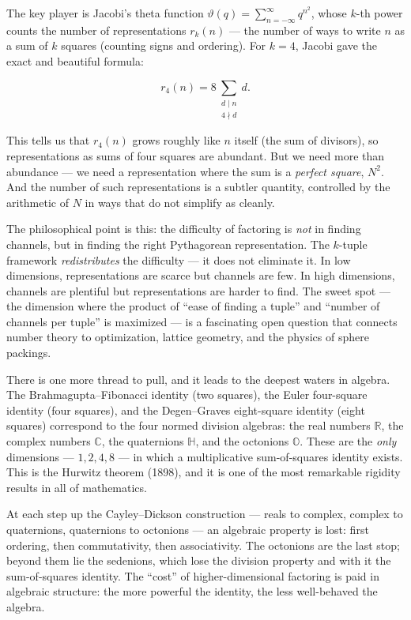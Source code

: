 The key player is Jacobi's theta function \(\vartheta(q) = \sum_{n=-\infty}^{\infty} q^{n^2}\), whose \(k\)-th power counts the number of representations \(r_k(n)\) --- the number of ways to write \(n\) as a sum of \(k\) squares (counting signs and ordering). For \(k = 4\), Jacobi gave the exact and beautiful formula:

\[r_4(n) = 8 \sum_{\substack{d \mid n \\ 4 \nmid d}} d.\]

This tells us that \(r_4(n)\) grows roughly like \(n\) itself (the sum of divisors), so representations as sums of four squares are abundant. But we need more than abundance --- we need a representation where the sum is a \emph{perfect square}, \(N^2\). And the number of such representations is a subtler quantity, controlled by the arithmetic of \(N\) in ways that do not simplify as cleanly.

The philosophical point is this: the difficulty of factoring is \emph{not} in finding channels, but in finding the right Pythagorean representation. The \(k\)-tuple framework \emph{redistributes} the difficulty --- it does not eliminate it. In low dimensions, representations are scarce but channels are few. In high dimensions, channels are plentiful but representations are harder to find. The sweet spot --- the dimension where the product of ``ease of finding a tuple'' and ``number of channels per tuple'' is maximized --- is a fascinating open question that connects number theory to optimization, lattice geometry, and the physics of sphere packings.

There is one more thread to pull, and it leads to the deepest waters in algebra. The Brahmagupta--Fibonacci identity (two squares), the Euler four-square identity (four squares), and the Degen--Graves eight-square identity (eight squares) correspond to the four normed division algebras: the real numbers \(\mathbb{R}\), the complex numbers \(\mathbb{C}\), the quaternions \(\mathbb{H}\), and the octonions \(\mathbb{O}\). These are the \emph{only} dimensions --- \(1, 2, 4, 8\) --- in which a multiplicative sum-of-squares identity exists. This is the Hurwitz theorem (1898), and it is one of the most remarkable rigidity results in all of mathematics.

At each step up the Cayley--Dickson construction --- reals to complex, complex to quaternions, quaternions to octonions --- an algebraic property is lost: first ordering, then commutativity, then associativity. The octonions are the last stop; beyond them lie the sedenions, which lose the division property and with it the sum-of-squares identity. The ``cost'' of higher-dimensional factoring is paid in algebraic structure: the more powerful the identity, the less well-behaved the algebra.

